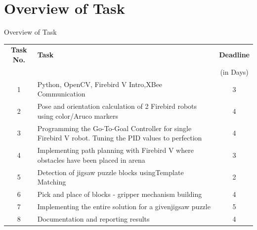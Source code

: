 \documentclass[10pt,a4paper]{beamer}
\begin{document}
\section{Overview of Task}
\begin{frame}{Overview of Task}
	\begin{tabular}{| c | p{17.5 em} | c |}\hline
		\textbf{Task No.} & \hspace{7em}\textbf{Task} & \textbf{Deadline} \\
		& & (in Days)\\\hline
		1 &\small{ Python, OpenCV, Firebird V Intro,\hspace{5 em}XBee Communication} & 3 \\\hline
		2 &\small{ Pose and orientation calculation of 2 Firebird robots using color/Aruco markers }& 4\\\hline
		3 &\small{ Programming the Go-To-Goal Controller for single Firebird V robot. Tuning the PID\hspace{3 em} values to perfection }& 4\\\hline
		4 &\small{ Implementing path planning with Firebird V where obstacles have been placed in arena }& 3\\\hline
		5 &\small{ Detection of jigsaw puzzle blocks using\hspace{3 em}Template Matching} & 2\\\hline
		6 &\small{ Pick and place of blocks - gripper mechanism building }& 4\\\hline
		7 &\small{ Implementing the entire solution for a given\hspace{3 em}jigsaw puzzle }& 5\\\hline
		8 &\small{ Documentation and reporting results }& 4\\\hline
	\end{tabular}
\end{frame}
\end{document}

